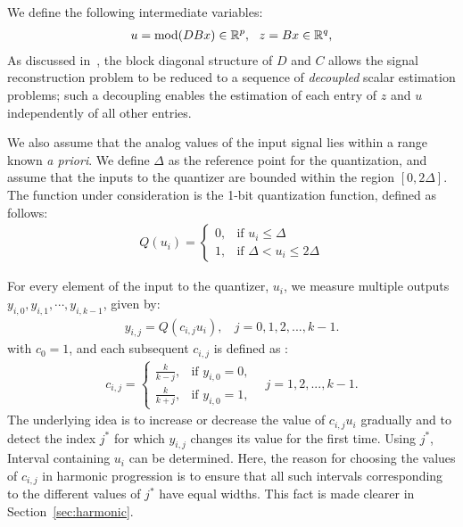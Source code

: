 We define the following intermediate variables:
\begin{align}\label{mainabr}
u = \mathrm{mod}(DBx)\in{\mathbb{R}}^p, \ \ z = Bx\in{\mathbb{R}}^q,
\end{align}
As discussed in~\cite{SoltaniHegde_ICASSP16}, the block diagonal structure of $D$ and $C$ allows the signal reconstruction problem to be reduced to a sequence of \emph{decoupled} scalar estimation problems; such a decoupling enables the estimation of each entry of $z$ and $u$ independently of all other entries.

We also assume that the analog values of the input signal lies within a range known \emph{a priori}. 
We define $\Delta$ as the reference point for the quantization, and assume that the inputs to the quantizer are bounded within the region $[0,2\Delta]$. 
The function under consideration is the 1-bit quantization function, 
defined as follows:
\begin{align}\label{eq:quantfunc}
Q(u_i)= 
\begin{cases}
0,& \text{if } u_i\leq {\Delta}\\
1,              & \text{if } {\Delta} < u_i \leq {2\Delta} 
\end{cases}
\end{align}

For every element of the input to the quantizer, $u_i$, we measure multiple outputs $y_{i,0},y_{i,1}, \cdots ,y_{i,k-1}$, given by:
\begin{align}\label{eq:hmshort}
y_{i,j} = Q(c_{i,j}u_i) , ~~~~ j = 0,1,2,...,k-1.
\end{align}
with $c_0 =1$, and each subsequent $c_{i,j}$ is defined as :
\begin{align}\label{eq:hm}
c_{i,j} = 
\begin{cases}
\frac{k}{k-j},& \text{if } y_{i,0} = 0,\\
\frac{k}{k+j},              & \text{if } y_{i,0} = 1,
\end{cases} ~~~~ j = 1,2,...,k-1.
\end{align}
The underlying idea is to increase or decrease the value of $c_{i,j}u_i$ gradually and to detect the index $j^*$ for which $y_{i,j}$ changes its value for the first time. Using $j^*$, Interval containing $u_i$ can be determined. Here, the reason for choosing the values of $c_{i,j}$ in harmonic progression is to ensure that all such intervals corresponding to the different values of $j^*$ have equal widths. This fact is made clearer in Section~\ref{sec:harmonic}.

